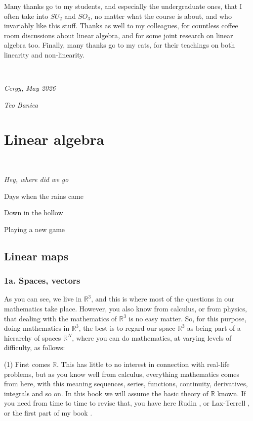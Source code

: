 \documentclass[12pt]{amsbook}
\begin{document}
\bigskip

Many thanks go to my students, and especially the undergraduate ones, that I often take into $SU_2$ and $SO_3$, no matter what the course is about, and who invariably like this stuff. Thanks as well to my colleagues, for countless coffee room discussions about linear algebra, and for some joint research on linear algebra too. Finally, many thanks go to my cats, for their teachings on both linearity and non-linearity.

\bigskip

\

{\em Cergy, May 2026}

\smallskip

{\em Teo Banica}

\baselineskip=15.95pt
\tableofcontents
\baselineskip=14pt

\part{Linear algebra}

\ \vskip50mm

\begin{center}
{\em Hey, where did we go

Days when the rains came

Down in the hollow

Playing a new game}
\end{center}

\chapter{Linear maps}

\section*{1a. Spaces, vectors}

As you can see, we live in $\mathbb R^3$, and this is where most of the questions in our mathematics take place. However, you also know from calculus, or from physics, that dealing with the mathematics of $\mathbb R^3$ is no easy matter. So, for this purpose, doing mathematics in $\mathbb R^3$, the best is to regard our space $\mathbb R^3$ as being part of a hierarchy of spaces $\mathbb R^N$, where you can do mathematics, at varying levels of difficulty, as follows:

\bigskip

(1) First comes $\mathbb R$. This has little to no interest in connection with real-life problems, but as you know well from calculus, everything mathematics comes from here, with this meaning sequences, series, functions, continuity, derivatives, integrals and so on. In this book we will assume the basic theory of $\mathbb R$ known. If you need from time to time to revise that, you have here Rudin \cite{ru1}, or Lax-Terrell \cite{lt1}, or the first part of my book \cite{ba1}.
\end{document}
